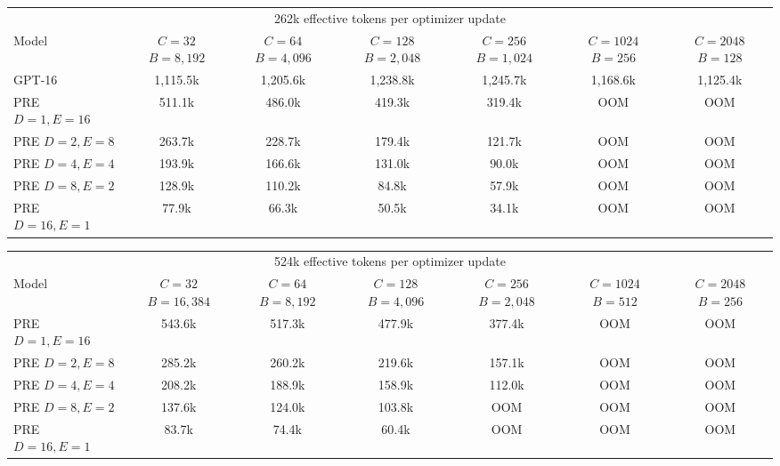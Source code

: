 \documentclass[10pt]{article}
\begin{document}
\begin{center}
\begin{tabular}{lcccccc}
  \toprule
  \multicolumn{7}{c}{262k effective tokens per optimizer update} \\
  \cmidrule(lr){1-7}
  Model & \shortstack{\(C=32\)\\\(B=8{,}192\)} & \shortstack{\(C=64\)\\\(B=4{,}096\)} & \shortstack{\(C=128\)\\\(B=2{,}048\)} & \shortstack{\(C=256\)\\\(B=1{,}024\)} & \shortstack{\(C=1024\)\\\(B=256\)} & \shortstack{\(C=2048\)\\\(B=128\)} \\
  \midrule
  GPT-16 & 1{,}115.5k & 1{,}205.6k & 1{,}238.8k & 1{,}245.7k & 1{,}168.6k & 1{,}125.4k \\
  PRE \(D=1,E=16\) & 511.1k & 486.0k & 419.3k & 319.4k & OOM & OOM \\
  PRE \(D=2,E=8\) & 263.7k & 228.7k & 179.4k & 121.7k & OOM & OOM \\
  PRE \(D=4,E=4\) & 193.9k & 166.6k & 131.0k & 90.0k & OOM & OOM \\
  PRE \(D=8,E=2\) & 128.9k & 110.2k & 84.8k & 57.9k & OOM & OOM \\
  PRE \(D=16,E=1\) & 77.9k & 66.3k & 50.5k & 34.1k & OOM & OOM \\
  \bottomrule
\end{tabular}

\vspace{0.7em}

\begin{tabular}{lcccccc}
  \toprule
  \multicolumn{7}{c}{524k effective tokens per optimizer update} \\
  \cmidrule(lr){1-7}
  Model & \shortstack{\(C=32\)\\\(B=16{,}384\)} & \shortstack{\(C=64\)\\\(B=8{,}192\)} & \shortstack{\(C=128\)\\\(B=4{,}096\)} & \shortstack{\(C=256\)\\\(B=2{,}048\)} & \shortstack{\(C=1024\)\\\(B=512\)} & \shortstack{\(C=2048\)\\\(B=256\)} \\
  \midrule
  PRE \(D=1,E=16\) & 543.6k & 517.3k & 477.9k & 377.4k & OOM & OOM \\
  PRE \(D=2,E=8\) & 285.2k & 260.2k & 219.6k & 157.1k & OOM & OOM \\
  PRE \(D=4,E=4\) & 208.2k & 188.9k & 158.9k & 112.0k & OOM & OOM \\
  PRE \(D=8,E=2\) & 137.6k & 124.0k & 103.8k & OOM & OOM & OOM \\
  PRE \(D=16,E=1\) & 83.7k & 74.4k & 60.4k & OOM & OOM & OOM \\
  \bottomrule
\end{tabular}
\end{center}
\end{document}
